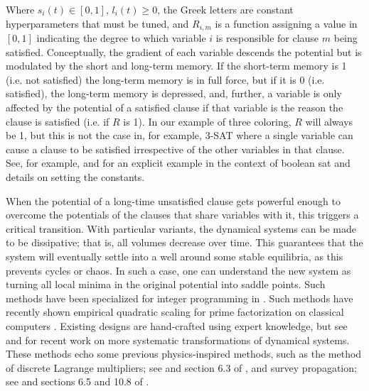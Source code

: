 Where $s_i(t) \in [0, 1]$, $l_i(t) \geq 0$, the Greek letters are constant hyperparameters that must be tuned, and $R_{i,m}$ is a function assigning a value in $[0, 1]$ indicating the degree to which variable $i$ is responsible for clause $m$ being satisfied. Conceptually, the gradient of each variable descends the potential but is modulated by the short and long-term memory. If the short-term memory is 1 (i.e. not satisfied) the long-term memory is in full force, but if it is 0 (i.e. satisfied), the long-term memory is depressed, and, further, a variable is only affected by the potential of a satisfied clause if that variable is the reason the clause is satisfied (i.e. if $R$ is 1). In our example of three coloring, $R$ will always be 1, but this is not the case in, for example, 3-SAT where a single variable can cause a clause to be satisfied irrespective of the other variables in that clause. See, for example, \citep{bearden2020efficient} and \citep{zhang2023implementation} for an explicit example in the context of boolean sat and details on setting the constants. 

When the potential of a long-time unsatisfied clause gets powerful enough to overcome the potentials of the clauses that share variables with it, this triggers a critical transition. With particular variants, the dynamical systems can be made to be dissipative; that is, all volumes decrease over time. This guarantees that the system will eventually settle into a well around some stable equilibria, as this prevents cycles or chaos. In such a case, one can understand the new system as turning all local minima in the original potential into saddle points. Such methods have been specialized for integer programming in \citep{traversa2018memcomputing}. Such methods have recently shown empirical quadratic scaling for prime factorization on classical computers \citep{sharp2023scaling}. Existing designs are hand-crafted using expert knowledge, but see \citep{caravelli2021global} and \citep{caravelli2023projective} for recent work on more systematic transformations of dynamical systems. These methods echo some previous physics-inspired methods, such as the method of discrete Lagrange multipliers; see \citep{shang1998discrete} and section 6.3 of \citep{biere2009handbook}, and survey propagation; see \citep{mezard2002analytic} and sections 6.5 and 10.8 of \citep{biere2009handbook}.